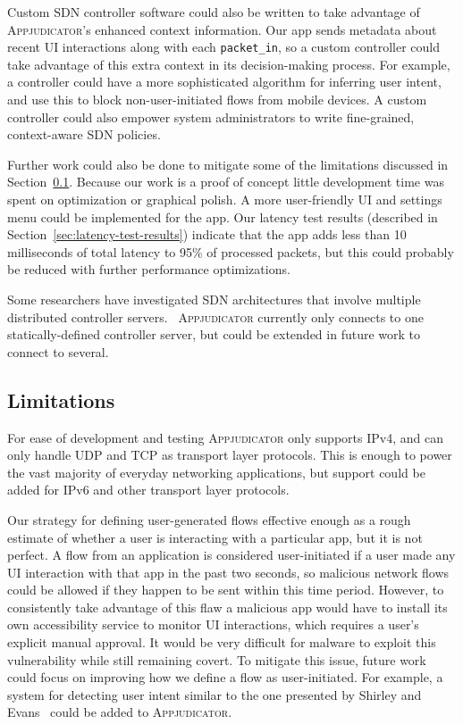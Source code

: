 Custom SDN controller software could also be written to take advantage of
\textsc{Appjudicator}'s enhanced context information. Our app sends metadata
about recent UI interactions along with each \texttt{packet\_in}, so a custom
controller could take advantage of this extra context in its decision-making
process. For example, a controller could have a more sophisticated algorithm for
inferring user intent, and use this to block non-user-initiated flows from
mobile devices. A custom controller could also empower system administrators to
write fine-grained, context-aware SDN policies. 

Further work could also be done to mitigate some of the limitations discussed in
Section~\ref{sec:limitations}. Because our work is a proof of concept little
development time was spent on optimization or graphical polish. A more
user-friendly UI and settings menu could be implemented for the app. Our latency
test results (described in Section~\ref{sec:latency-test-results}) indicate that
the app adds less than 10 milliseconds of total latency to 95\% of processed
packets, but this could probably be reduced with further performance
optimizations.

Some researchers have investigated SDN architectures that involve multiple
distributed controller servers.~\cite{dixit2013, oktian2017}
\textsc{Appjudicator} currently only connects to one statically-defined
controller server, but could be extended in future work to connect to several.

\subsection{Limitations}
\label{sec:limitations}

For ease of development and testing \textsc{Appjudicator} only supports IPv4,
and can only handle UDP and TCP as transport layer protocols. This is enough to
power the vast majority of everyday networking applications, but support could
be added for IPv6 and other transport layer protocols.

Our strategy for defining user-generated flows effective enough as a rough
estimate of whether a user is interacting with a particular app, but it is not
perfect. A flow from an application is considered user-initiated if a user made
any UI interaction with that app in the past two seconds, so malicious network
flows could be allowed if they happen to be sent within this time period.
However, to consistently take advantage of this flaw a malicious app would have
to install its own accessibility service to monitor UI interactions, which
requires a user's explicit manual approval. It would be very difficult for
malware to exploit this vulnerability while still remaining covert. To mitigate
this issue, future work could focus on improving how we define a flow as
user-initiated. For example, a system for detecting user intent similar to the
one presented by Shirley and Evans~\cite{shirley2008} could be added to
\textsc{Appjudicator}.

